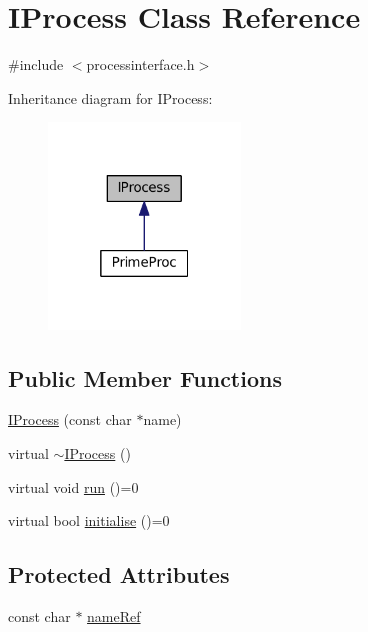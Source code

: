 \hypertarget{classIProcess}{}\section{I\+Process Class Reference}
\label{classIProcess}


{\ttfamily \#include $<$processinterface.\+h$>$}



Inheritance diagram for I\+Process\+:
\nopagebreak
\begin{figure}[H]
\begin{center}
\leavevmode
\includegraphics[width=145pt]{classIProcess__inherit__graph}
\end{center}
\end{figure}
\subsection*{Public Member Functions}
\begin{DoxyCompactItemize}
\item 
\hyperlink{classIProcess_a9718ec3b13da2c71322bb32d703cb618}{I\+Process} (const char $\ast$name)
\item 
virtual \hyperlink{classIProcess_af9ed5e42aa4c8d489d45a25a278434e1}{$\sim$\+I\+Process} ()
\item 
virtual void \hyperlink{classIProcess_ae2a840bd8730af48b04254387ba3f9e3}{run} ()=0
\item 
virtual bool \hyperlink{classIProcess_a238bce621ce9e6cf7c9dc4201bdfb8b2}{initialise} ()=0
\end{DoxyCompactItemize}
\subsection*{Protected Attributes}
\begin{DoxyCompactItemize}
\item 
const char $\ast$ \hyperlink{classIProcess_ad8e9a2d6537a7671236456af14b3a5b7}{name\+Ref}
\end{DoxyCompactItemize}


